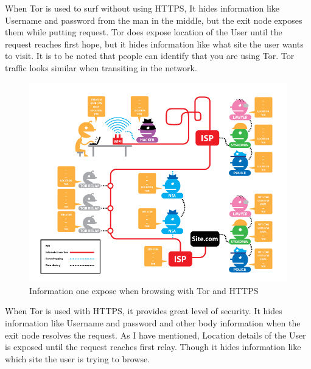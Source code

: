 \documentclass{article}
\begin{document}
      When Tor is used to surf without using HTTPS, It hides information like
      Username and password from the man in the middle, but the exit node
      exposes them while putting request. Tor does expose location of the User
      until the request reaches first hope, but it hides information like what
      site the user wants to visit. It is to be noted that people can identify
      that you are using Tor. Tor traffic looks similar when transiting in the
      network.


      \begin{figure}[h!]
        \includegraphics[width=\linewidth]{yes_tor_yes_https.png}
        \caption{Information one expose when browsing with Tor and HTTPS}
        \label{fig:no_https_no_tor}
      \end{figure}

      When Tor is used with HTTPS, it provides great level of security. It
      hides information like Username and password and other body information
      when the exit node resolves the request. As I have mentioned, Location
      details of the User is exposed until the request reaches first relay.
      Though it hides information like which site the user is trying to browse.
\end{document}

